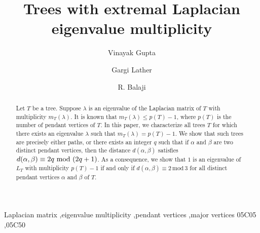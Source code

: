 \documentclass[preprint,12pt]{elsarticle}
\newcommand{\1}{\mathbf{1}}
\newcommand{\0}{\mathbf{0}}
\begin{document}
\begin{frontmatter}



\title{Trees with extremal Laplacian eigenvalue multiplicity}



\author[label1]{Vinayak Gupta}
\author[label1]{Gargi Lather}
\author[label1]{R. Balaji}


\begin{abstract}
Let $T$ be a tree.
Suppose $\lambda$ is an eigenvalue of
the Laplacian matrix of $T$ with multiplicity $m_{T}(\lambda)$.
It is known that $m_{T}(\lambda) \leq p(T)-1$,
where $p(T)$ is the number of pendant vertices of $T$.
In this paper, we characterize all trees $T$ for which
there exists an eigenvalue $\lambda$ such that $m_{T}(\lambda)=p(T)-1$.
We show that such trees are precisely either paths, or
there exists an integer $q$ such that if $\alpha$ and $\beta$ are two distinct pendant vertices, then the distance $d(\alpha,\beta)$ satisfies
$d(\alpha, \beta) \equiv 2q ~{\rm{mod}}~(2q+1)$.
As a consequence, we show that $1$ is an eigenvalue of $L_T$ with multiplicity $p(T)-1$ if and only if
$d(\alpha,\beta) \equiv 2\,\mbox{mod}\, 3$ for all distinct pendant vertices $\alpha$ and $\beta$ of $T$.
\end{abstract}

\begin{keyword}
Laplacian matrix \sep eigenvalue multiplicity \sep pendant vertices \sep major vertices 
\MSC 05C05 \sep 05C50
\end{keyword}
\end{frontmatter}
\end{document}
